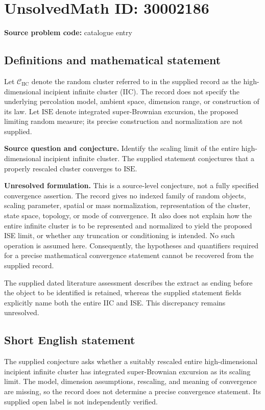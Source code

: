 \documentclass[11pt]{article}
\begin{document}
\section*{UnsolvedMath ID: 30002186}
\textbf{Source problem code:} catalogue entry
\subsection{Definitions and mathematical statement}
Let \(\mathcal C_{\mathrm{IIC}}\) denote the random cluster referred to in the supplied record as the high-dimensional incipient infinite cluster (IIC). The record does not specify the underlying percolation model, ambient space, dimension range, or construction of its law. Let \(\mathrm{ISE}\) denote integrated super-Brownian excursion, the proposed limiting random measure; its precise construction and normalization are not supplied.

\textbf{Source question and conjecture.} Identify the scaling limit of the entire high-dimensional incipient infinite cluster. The supplied statement conjectures that a properly rescaled cluster converges to \(\mathrm{ISE}\).

\textbf{Unresolved formulation.} This is a source-level conjecture, not a fully specified convergence assertion. The record gives no indexed family of random objects, scaling parameter, spatial or mass normalization, representation of the cluster, state space, topology, or mode of convergence. It also does not explain how the entire infinite cluster is to be represented and normalized to yield the proposed ISE limit, or whether any truncation or conditioning is intended. No such operation is assumed here. Consequently, the hypotheses and quantifiers required for a precise mathematical convergence statement cannot be recovered from the supplied record.

The supplied dated literature assessment describes the extract as ending before the object to be identified is retained, whereas the supplied statement fields explicitly name both the entire IIC and ISE. This discrepancy remains unresolved.
\subsection{Short English statement}
The supplied conjecture asks whether a suitably rescaled entire high-dimensional incipient infinite cluster has integrated super-Brownian excursion as its scaling limit. The model, dimension assumptions, rescaling, and meaning of convergence are missing, so the record does not determine a precise convergence statement. Its supplied open label is not independently verified.
\end{document}
